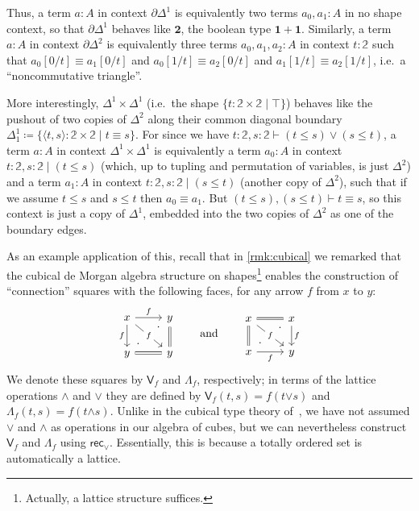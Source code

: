 \documentclass[12pt]{amsart}
\theoremstyle{plain}
\theoremstyle{definition}
\theoremstyle{remark}
\numberwithin{equation}{section}
\newcommand{\jdeq}{\equiv}
\newcommand{\defeq}{\coloneqq}
\newcommand{\types}{\vdash}
\newcommand{\unittype}{\ensuremath{\mathbf{1}}}
\newcommand{\booltype}{\ensuremath{\mathbf{2}}}
\newcommand{\sh}[2]{\{#1\mid #2\}}
\newcommand{\pair}[1]{\langle #1\rangle}
\newcommand{\rec}{\mathsf{rec}}
\newcommand{\connmax}[1]{\mathsf{V}_{#1}}
\newcommand{\connmin}[1]{\mathsf{\Lambda}_{#1}}
\newcommand{\two}{\mathbb{2}}
\begin{document}
Thus, a term $a:A$ in context $\partial\Delta^1$ is equivalently two terms $a_0,a_1:A$ in no shape context, so that $\partial\Delta^1$ behaves like $\booltype$, the boolean type $\unittype + \unittype$.
Similarly, a term $a:A$ in context $\partial\Delta^2$ is equivalently three terms $a_0,a_1,a_2:A$ in context $t:\two$ such that $a_0[0/t] \jdeq a_1[0/t]$ and $a_0[1/t] \jdeq a_2[0/t]$ and $a_1[1/t] \jdeq a_2[1/t]$, i.e.\ a ``noncommutative triangle''.

More interestingly, $\Delta^1\times \Delta^1$ (i.e.\ the shape $\sh{t:\two\times\two}{\top}$) behaves like the pushout of two copies of $\Delta^2$ along their common diagonal boundary $\Delta^1_1 \defeq \sh{\pair{t,s} : \two \times \two}{t \jdeq s}$.
For since we have $t:\two,s:\two \types (t\le s)\lor (s\le t)$, a term $a:A$ in context $\Delta^1\times \Delta^1$ is equivalently a term $a_0:A$ in context $t:\two, s:\two \mid (t\le s)$ (which, up to tupling and permutation of variables, is just $\Delta^2$) and a term $a_1:A$ in context $t:\two, s:\two \mid (s\le t)$ (another copy of $\Delta^2$), such that if we assume $t\le s$ and $s\le t$ then $a_0\jdeq a_1$.
But $(t\le s),(s\le t)\types t\jdeq s$, so this context is just a copy of $\Delta^1$, embedded into the two copies of $\Delta^2$ as one of the boundary edges.

As an example application of this, recall that in \cref{rmk:cubical} we remarked that the cubical de Morgan algebra structure on shapes\footnote{Actually, a lattice structure suffices.} enables the construction of ``connection'' squares with the following faces, for any arrow $f$ from $x$ to $y$:
  \begin{equation}
  \begin{tikzcd}
    x \arrow[r, "f"] \arrow[dr, "f" description] \arrow[d, "f"'] & y \arrow[d, equals] \\
    y \arrow[r, equals]  \arrow[ur, phantom, "\cdot" very near start, "\cdot" very near end] & y
  \end{tikzcd}
  \qquad\text{and}\qquad
  \begin{tikzcd}
    x \arrow[r, equals] \arrow[dr, "f" description] \arrow[d, equals] & x \arrow[d, "f"] \\
    x \arrow[r, "f"']  \arrow[ur, phantom, "\cdot" very near start, "\cdot" very near end] & y
  \end{tikzcd}\label{eq:connection-squares}
  \end{equation}
We denote these squares by $\connmax f$ and $\connmin f$, respectively; in terms of the lattice operations $\pmb{\land}$ and $\pmb{\lor}$ they are defined by $\connmax f(t,s) = f(t\mathbin{\pmb{\lor}}s)$ and $\connmin f(t,s) = f(t\mathbin{\pmb{\land}}s)$.
Unlike in the cubical type theory of~\cite{CCHM}, we have not assumed $\mathbin{\pmb{\lor}}$ and $\mathbin{\pmb{\land}}$ as operations in our algebra of cubes, but we can nevertheless construct $\connmax f$ and $\connmin f$ using $\rec_\lor$.
Essentially, this is because a totally ordered set is automatically a lattice.
\end{document}
